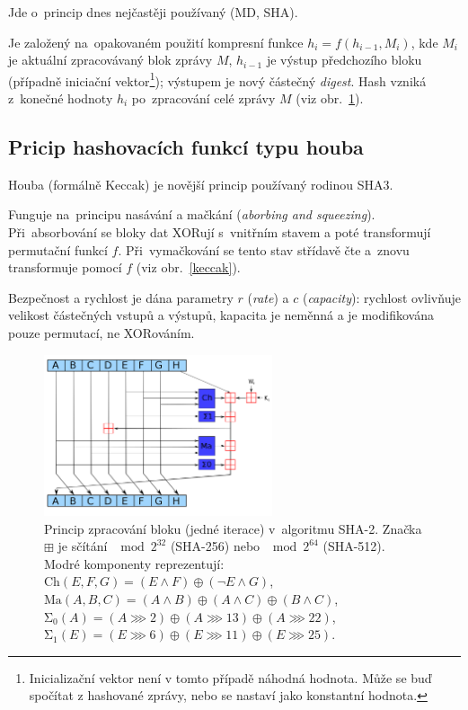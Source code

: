 Jde o~princip dnes nejčastěji používaný (MD, SHA).

Je založený na~opakovaném použití kompresní funkce $h_i = f(h_{i-1}, M_i)$, kde
$M_i$ je aktuální zpracovávaný blok zprávy $M$,
$h_{i-1}$ je výstup předchozího bloku (případně iniciační vektor\footnote{Inicializační vektor není v tomto případě náhodná hodnota. Může se buď spočítat z hashované zprávy, nebo se nastaví jako konstantní hodnota.});
výstupem je nový částečný \emph{digest}.
Hash vzniká z~konečné hodnoty $h_i$ po~zpracování celé zprávy $M$ (viz obr.~\ref{sha}).


\subsection{Pricip hashovacích funkcí typu houba}

Houba (formálně Keccak) je novější princip používaný rodinou SHA3.

Funguje na~principu nasávání a mačkání (\emph{aborbing and squeezing}).
Při~absorbování se bloky dat XORují s~vnitřním stavem a poté transformují permutační funkcí $f$.
Při~vymačkování se tento stav střídavě čte a~znovu transformuje pomocí $f$ (viz obr.~\ref{keccak}).

Bezpečnost a rychlost je dána parametry $r$ (\emph{rate}) a $c$ (\emph{capacity}): rychlost ovlivňuje velikost částečných vstupů a výstupů, kapacita je neměnná a je modifikována pouze permutací, ne XORováním.

\begin{figure}
    \centering
    \includegraphics[width=0.6\textwidth]{img/sha-construction}
    \caption{
        Princip zpracování bloku (jedné iterace) v~algoritmu SHA-2.
        Značka $\boxplus$ je sčítání $\mod 2^{32}$ (SHA-256) nebo $\mod 2^{64}$ (SHA-512).
        Modré komponenty reprezentují:
        \\
        $\mathrm{Ch}(E,F,G) = (E \wedge F) \oplus (\neg E \wedge G)$, \\
        $\mathrm{Ma}(A,B,C) = (A \wedge B) \oplus (A \wedge C) \oplus (B \wedge C)$, \\
        $\mathrm{\Sigma_0}(A) = (A \ggg 2) \oplus (A \ggg 13) \oplus (A \ggg 22)$, \\
        $\mathrm{\Sigma_1}(E) = (E \ggg 6) \oplus (E \ggg 11) \oplus (E \ggg 25)$.
        }
    \label{sha}
\end{figure}

